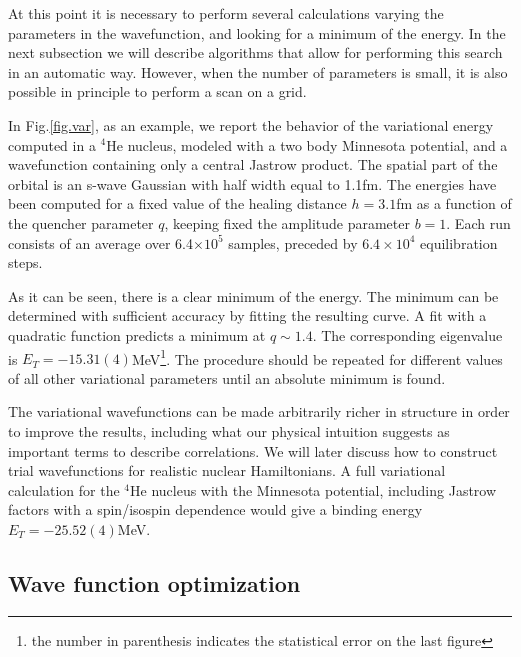 At this point it is necessary to perform several calculations varying the parameters in the wavefunction, and looking for a minimum of the energy. In the next subsection we will describe algorithms that allow for performing this search in an automatic way. However, when the number of parameters is small, it is also possible in principle to perform a scan on a grid. 

In Fig.\ref{fig.var}, as an example, we report the behavior of the variational energy computed in a $^4$He nucleus, modeled with a two body Minnesota potential, and a wavefunction containing only a central Jastrow product. The spatial part of the orbital is an s-wave Gaussian with half width equal to 1.1fm. The energies have been computed for a fixed value of the healing distance $h=3.1$fm as a function of the quencher parameter $q$, keeping fixed the amplitude parameter $b=1$. Each run consists of an average over 6.4$\times 10^5$ samples, preceded by $6.4\times 10^4$ equilibration steps. 

As it can be seen, there is a clear minimum of the energy. 
The minimum can be determined with sufficient accuracy by fitting the resulting curve. A fit with a quadratic function predicts a minimum at $q\sim1.4$. The corresponding eigenvalue is $E_T=-15.31(4)$MeV\footnote{the number in parenthesis indicates the statistical error on the last figure}. The procedure should be repeated for different values of all other variational parameters until an absolute minimum is found. 

The variational wavefunctions can be made arbitrarily richer in structure in order to improve the results, including what our physical intuition suggests as important terms to describe correlations. We will later discuss how to construct trial wavefunctions for realistic nuclear Hamiltonians.
A full variational calculation for the $^4$He nucleus with the Minnesota potential, including Jastrow factors with a spin/isospin dependence would give a binding energy $E_T=-25.52(4)$MeV.

 

\subsection{Wave function optimization}
